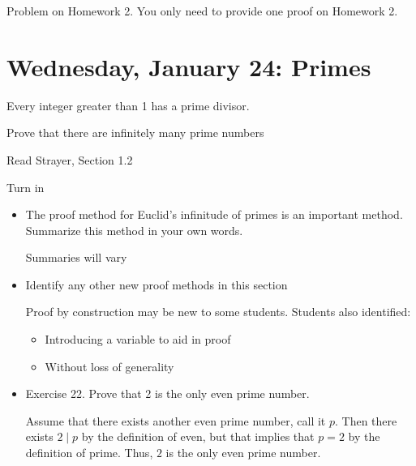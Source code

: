 \documentclass{ximera}
\begin{document}
\begin{br} 
\begin{enumerate}
\end{enumerate}

\begin{solution}
 Problem on Homework 2. You only need to provide one proof on Homework 2.
\end{solution}
\end{br}
\section{Wednesday, January 24: Primes}

\begin{obj}
\item  Every integer greater than 1 has a prime divisor.
\item  Prove that there are infinitely many prime numbers
\end{obj}

\begin{pre}
 \item[Read] Strayer, Section 1.2
 \item[Turn in] 
\begin{itemize}
 \item The proof method for Euclid's infinitude of primes is an important method. Summarize this method in your own words.
 
\begin{solution}
 Summaries will vary
\end{solution}
 \item Identify any other new proof methods in this section
 
\begin{solution}
 Proof by construction may be new to some students. Students also identified: 
\begin{itemize}
 \item Introducing a variable to aid in proof
 \item Without loss of generality
 
\end{itemize}
\end{solution}
 \item Exercise 22. Prove that 2 is the only even prime number.
 
\begin{solution}
 Assume that there exists another even prime number, call it $p$. Then there exists $2\mid p$ by the definition of even, but that implies that $p=2$ by the definition of prime. Thus, $2$ is the only even prime number.
\end{solution}
\end{itemize}
\end{pre}
\end{document}
